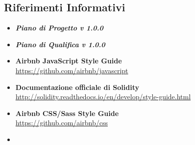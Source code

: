 \documentclass[NormeDiProgetto.tex]{subfiles}
\begin{document}
\subsection{Riferimenti Informativi}
\begin{itemize}
	\item \textbf{\textit{Piano di Progetto v 1.0.0}}
	\item \textbf{\textit{Piano di Qualifica v 1.0.0}}
	\item \textbf{Airbnb JavaScript Style Guide}\\
	\href{https://github.com/airbnb/javascript}{https://github.com/airbnb/javascript}
	\item \textbf{Documentazione officiale di Solidity}\\
	\href{http://solidity.readthedocs.io/en/develop/style-guide.html}{http://solidity.readthedocs.io/en/develop/style-guide.html}
	\item \textbf{Airbnb CSS/Sass Style Guide}\\
	\href{https://github.com/airbnb/css}{https://github.com/airbnb/css}
	\item 
\end{itemize}
\end{document}
